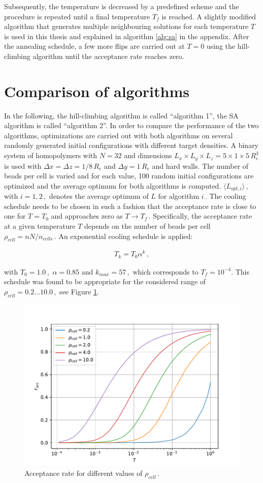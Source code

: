 \documentclass[bachelor,       %
               twoside,        %
               BCOR10mm,       %
               ngerman, english %
               ]{GAUBM}
\begin{document}
Subsequently, the temperature is decreased by a predefined scheme and the procedure is repeated until a final temperature $T_f$ is reached. A slightly modified algorithm that generates multiple neighbouring solutions for each temperature $T$ is used in this thesis and explained in algorithm \ref{alg:sa} in the appendix. After the annealing schedule, a few more flips are carried out at $T=0$ using the hill-climbing algorithm until the acceptance rate reaches zero. 

\section{Comparison of algorithms}

In the following, the hill-climbing algorithm is called \enquote{algorithm 1}, the \ac{SA} algorithm is called \enquote{algorithm 2}. In order to compare the performance of the two algorithms, optimizations are carried out with both algorithms on several randomly generated initial configurations with different target densities. A binary system of homopolymers with $N=32$ and dimensions $L_x\times L_y\times L_z=5\times1\times5\,R_e^3$ is used with $\Delta x=\Delta z=1/8\,R_e$ and $\Delta y=1\,R_e$ and hard walls. The number of beads per cell is varied and for each value, 100 random initial configurations are optimized and the average optimum for both algorithms is computed. $\langle  L_{opt,i}\rangle\,,$ with $i=1,2\,,$  denotes the average optimum of $L$ for algorithm $i\,.$ The cooling schedule needs to be chosen in such a fashion that the acceptance rate is close to one for $T=T_0$ and approaches zero as $T\rightarrow T_f\,.$ Specifically, the acceptance rate at a given temperature $T$ depends on the number of beads per cell $\rho_{cell}=nN/n_{cells}\,.$ An exponential cooling schedule  is applied:

\begin{align}
    T_k=T_0\alpha^k\,,
\end{align}

with $T_0=1.0\,,$ $\alpha=0.85$ and $k_{max}=57\,,$ which corresponds to $T_f=10^{-4}$. This schedule was found to be appropriate for the considered range of $\rho_{cell}=0.2\dots 10.0\,,$ see Figure \ref{fig:accrate}.


\begin{figure}[h]
    \centering
    \includegraphics[width=0.6\linewidth]{figures/accrate.pdf}
    \caption{Acceptance rate for different values of $\rho_{cell}\,.$}
    \label{fig:accrate}
\end{figure}
\end{document}
